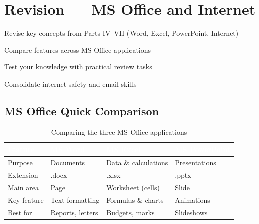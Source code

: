 \chapter{Revision --- MS Office and Internet}
\label{ch:revision-office}

\begin{objectives}
  \item Revise key concepts from Parts IV--VII (Word, Excel, PowerPoint, Internet)
  \item Compare features across MS Office applications
  \item Test your knowledge with practical review tasks
  \item Consolidate internet safety and email skills
\end{objectives}


\section{MS Office Quick Comparison}
\label{sec:office-compare}

\begin{table}[H]
\centering
\caption{Comparing the three MS Office applications}
\label{tab:office-compare}
\renewcommand{\arraystretch}{1.3}
\begin{tabularx}{\textwidth}{l X X X}
\toprule
\rowcolor{HeaderRow}
\textcolor{white}{\textbf{Feature}} & \textcolor{white}{\textbf{MS Word}} & \textcolor{white}{\textbf{MS Excel}} & \textcolor{white}{\textbf{MS PowerPoint}} \\
\midrule
\rowcolor{RowLight} Purpose & Documents & Data \& calculations & Presentations \\
\rowcolor{RowDark} Extension & .docx & .xlsx & .pptx \\
\rowcolor{RowLight} Main area & Page & Worksheet (cells) & Slide \\
\rowcolor{RowDark} Key feature & Text formatting & Formulas \& charts & Animations \\
\rowcolor{RowLight} Best for & Reports, letters & Budgets, marks & Slideshows \\
\bottomrule
\end{tabularx}
\end{table}


